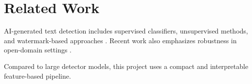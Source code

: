 \section{Related Work}

AI-generated text detection includes supervised classifiers, unsupervised
methods, and watermark-based approaches \citep{pu2022deepfake,mitchell2023detectgpt}.
Recent work also emphasizes robustness in open-domain settings \citep{li2024mage}.

Compared to large detector models, this project uses a compact and interpretable
feature-based pipeline.
